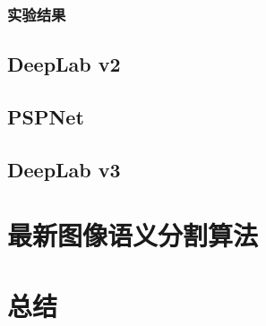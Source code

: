 \documentclass[cn]{elegantbook}
\begin{document}
\subsection{实验结果}

\section{DeepLab v2}

\section{PSPNet}

\section{DeepLab v3}

\chapter{最新图像语义分割算法}

\chapter{总结}





\end{document}
